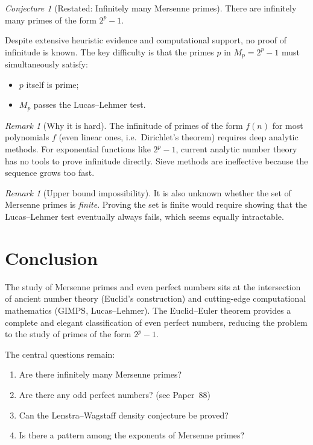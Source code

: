 \documentclass[12pt,a4paper]{amsart}
\theoremstyle{definition}
\theoremstyle{remark}
\newtheorem{remark}[theorem]{Remark}
\newtheorem{conjecture}[theorem]{Conjecture}
\begin{document}
\begin{conjecture}[Restated: Infinitely many Mersenne primes]
There are infinitely many primes of the form $2^p - 1$.
\end{conjecture}

Despite extensive heuristic evidence and computational support, no proof
of infinitude is known.
The key difficulty is that the primes $p$ in $M_p = 2^p - 1$ must simultaneously
satisfy:
\begin{itemize}[nosep]
  \item $p$ itself is prime;
  \item $M_p$ passes the Lucas--Lehmer test.
\end{itemize}

\begin{remark}[Why it is hard]
The infinitude of primes of the form $f(n)$ for most polynomials $f$ (even
linear ones, i.e.\ Dirichlet's theorem) requires deep analytic methods.
For exponential functions like $2^p - 1$, current analytic number theory has
no tools to prove infinitude directly.
Sieve methods are ineffective because the sequence grows too fast.
\end{remark}

\begin{remark}[Upper bound impossibility]
It is also unknown whether the set of Mersenne primes is \emph{finite}.
Proving the set is finite would require showing that the Lucas--Lehmer test
eventually always fails, which seems equally intractable.
\end{remark}

\section{Conclusion}

The study of Mersenne primes and even perfect numbers sits at the intersection
of ancient number theory (Euclid's construction) and cutting-edge computational
mathematics (GIMPS, Lucas--Lehmer).
The Euclid--Euler theorem provides a complete and elegant classification of
even perfect numbers, reducing the problem to the study of primes of the
form $2^p - 1$.

The central questions remain:
\begin{enumerate}[label=(\arabic*)]
  \item Are there infinitely many Mersenne primes?
  \item Are there any odd perfect numbers? (see Paper~88)
  \item Can the Lenstra--Wagstaff density conjecture be proved?
  \item Is there a pattern among the exponents of Mersenne primes?
\end{enumerate}
\end{document}
